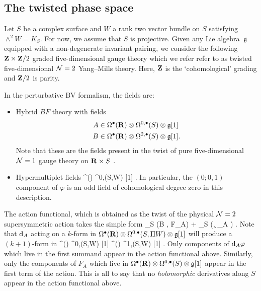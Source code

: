 \documentclass[11pt]{amsart}
\begin{document}
\subsection{The twisted phase space}

Let $S$ be a complex surface and $W$ a rank two vector bundle on $S$ satisfying $\wedge^2 W = K_S$.
For now, we assume that $S$ is projective.
Given any Lie algebra~$\mathfrak{g}$ equipped with a non-degenerate invariant pairing, we consider the following $\mathbf{Z} \times \mathbf{Z}/2$ graded five-dimensional gauge theory which we refer refer to as twisted five-dimensional $\mathcal N=2$ Yang--Mills theory.
Here, $\mathbf{Z}$ is the `cohomological' grading and $\mathbf{Z}/2$ is parity.

In the perturbative BV formalism, the fields are:
\begin{itemize}
\item Hybrid $BF$ theory with fields
\begin{align*}
A & \in \Omega^{\bullet}(\mathbf{R}) \otimes \Omega^{0,\bullet}(S) \otimes \mathfrak{g} [1] \\
B & \in \Omega^{\bullet}(\mathbf{R}) \otimes \Omega^{2,\bullet}(S)\otimes \mathfrak{g} [1] .
\end{align*}
Note that these are the fields present in the twist of pure five-dimensional $\mathcal N=1$ gauge theory on $\mathbf{R} \times S$ \cite{ESW}.
\item Hypermultiplet fields
\beqn
\varphi \in \Omega^\bu(\R) \otimes \Omega^{0,\bu}(S,\Pi W) \otimes {} [1] .
\eeqn
In particular, the $(0;0,1)$ component of $\varphi$ is an odd field of cohomological degree zero in this description.
\end{itemize}
The action functional, which is obtained as the twist of the physical $\mathcal N=2$ supersymmetric action takes the simple form
\beqn
\int_{\R \times S} (B , F_A) +  \int_{\R \times S} (\varphi, \d_A \varphi) .
\eeqn
Note that ${\rm d}_A$ acting on a $k$-form in $\Omega^\bullet(\mathbf{R}) \otimes \Omega^{0,\bullet}(S,\Pi W) \otimes \mathfrak{g} [1]$ will produce a $(k+1)$-form in
\beqn
\Omega^\bu(\R) \otimes \Omega^{0,\bu}(S,\Pi W) \otimes {} [1] \oplus \Omega^\bu(\R) \otimes \Omega^{1,\bu}(S,\Pi W) \otimes {} [1] .
\eeqn
Only components of ${\rm d}_A \varphi$ which live in the first summand appear in the action functional above.
Similarly, only the components of $F_A$ which live in $\Omega^\bullet(\mathbf{R}) \otimes \Omega^{0,\bullet}(S) \otimes \mathfrak{g}[1]$ appear in the first term of the action.
This is all to say that no \textit{holomorphic} derivatives along $S$ appear in the action functional above.
\end{document}
